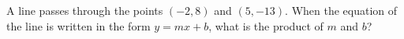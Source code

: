 A line passes through the points $(-2,8)$ and $(5,-13)$. When the equation of the line is written in the form $y=mx+b$, what is the product of $m$ and $b$?
